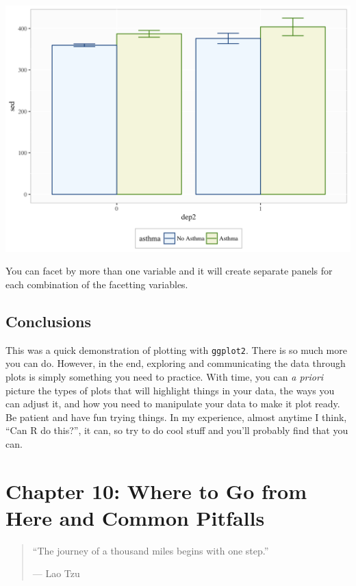 \documentclass[]{tufte-book}
\theoremstyle{definition}
\theoremstyle{definition}
\theoremstyle{remark}
\begin{document}
\includegraphics{_main_files/figure-latex/unnamed-chunk-154-1}

You can facet by more than one variable and it will create separate
panels for each combination of the facetting variables.

\section*{Conclusions}\label{conclusions-5}

This was a quick demonstration of plotting with \texttt{ggplot2}. There
is so much more you can do. However, in the end, exploring and
communicating the data through plots is simply something you need to
practice. With time, you can \emph{a priori} picture the types of plots
that will highlight things in your data, the ways you can adjust it, and
how you need to manipulate your data to make it plot ready. Be patient
and have fun trying things. In my experience, almost anytime I think,
``Can R do this?'', it can, so try to do cool stuff and you'll probably
find that you can.

\chapter*{Chapter 10: Where to Go from Here and Common
Pitfalls}\label{chapter-10-where-to-go-from-here-and-common-pitfalls}

\begin{quote}
``The journey of a thousand miles begins with one step.''

--- Lao Tzu
\end{quote}
\end{document}
